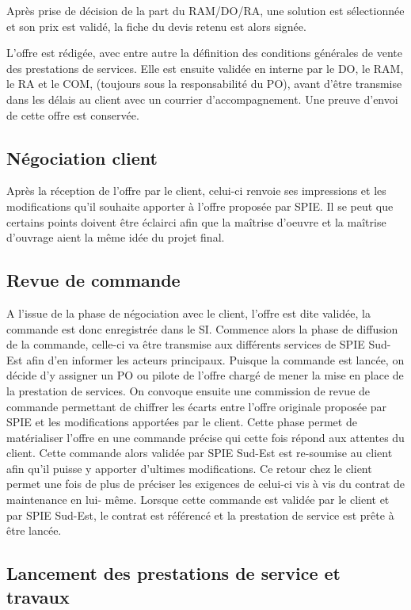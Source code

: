 Après prise de décision de la part du RAM/DO/RA, une solution est sélectionnée et son prix est validé, la fiche du devis retenu est alors signée.

L’offre est rédigée, avec entre autre la définition des conditions générales de vente des prestations de services. Elle est ensuite validée en interne par le DO, le RAM, le RA et le COM, (toujours sous la responsabilité du PO), avant d’être transmise dans les délais au client avec un courrier d’accompagnement. Une preuve d’envoi de cette offre est conservée.

\subsection{Négociation client}

Après la réception de l’offre par le client, celui-ci renvoie ses impressions et les modifications qu’il souhaite apporter à l’offre proposée par SPIE. Il se peut que certains points doivent être éclairci afin que la maîtrise d’oeuvre et la maîtrise d’ouvrage aient la même idée du projet final.

\subsection{Revue de commande}

A l’issue de la phase de négociation avec le client, l’offre est dite validée, la commande est donc enregistrée dans le SI. Commence alors la phase de diffusion de la commande, celle-ci va être transmise aux différents services de SPIE Sud-Est afin d’en informer les acteurs principaux. Puisque la commande est lancée, on décide d’y assigner un PO ou pilote de l’offre chargé de mener la mise en place de la prestation de services. On convoque ensuite une commission de revue de commande permettant de chiffrer les écarts entre l’offre originale proposée par SPIE et les modifications apportées par le client. Cette phase permet de matérialiser l’offre en une commande précise qui cette fois répond aux attentes du client. Cette commande alors validée par SPIE Sud-Est est re-soumise au client afin qu’il puisse y apporter d’ultimes modifications. Ce retour chez le client permet une fois de plus de préciser les exigences de celui-ci vis à vis du contrat de maintenance en lui- même. Lorsque cette commande est validée par le client et par SPIE Sud-Est, le contrat est référencé et la prestation de service est prête à être lancée.

\subsection{Lancement des prestations de service et travaux}

